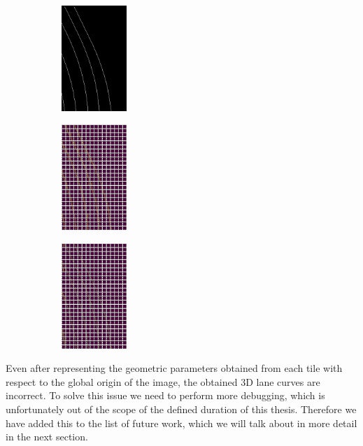 \begin{figure}[h]
      \caption{(a) Binary lane segmentation mask (b) Detected lanes via Hough Transform (c) Detected lanes via Hough Transform and using Hesse normal form as a post-processing step }
        \centering
        \begin{subfigure}{0.2\textwidth}
        \includegraphics[width=1\linewidth, height=4cm]{images/test_bev_lanes.jpeg} 
        \caption{}
        \label{fig:subim1}
        \end{subfigure}
        \begin{subfigure}{0.2\textwidth}
        \includegraphics[width=1\linewidth,height=4cm]{images/detected_lines_r.jpg}
        \caption{}
        \label{fig:subim2}
        \end{subfigure}
        \begin{subfigure}{0.2\textwidth}
        \includegraphics[width=1\linewidth,height=4cm]{images/detected_lines_rprime.jpg}
        \caption{}
        \label{fig:subim2}
        \end{subfigure}
        \end{figure}
        
Even after representing the geometric parameters obtained from each tile with respect to the global origin of the image, the obtained 3D lane curves are incorrect. To solve this issue we need to perform more debugging, which is unfortunately out of the scope of the defined duration of this thesis. Therefore we have added this to the list of future work, which we will talk about in more detail in the next section.

